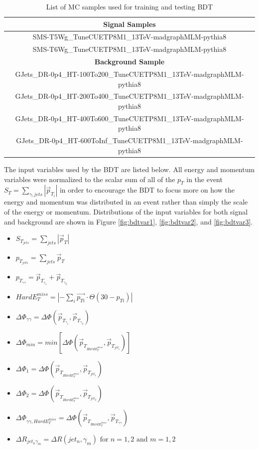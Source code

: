 \begin{table}[h]
	\centering
	\caption{List of MC samples used for training and testing BDT}
	\begin{tabular}{|c|}
		\hline
		\textbf{Signal Samples} \\  
		\hline
		SMS-T5Wg\_TuneCUETP8M1\_13TeV-madgraphMLM-pythia8\\
		\hline
		SMS-T6Wg\_TuneCUETP8M1\_13TeV-madgraphMLM-pythia8\\
		\hline
		\textbf{Background Sample} \\ 
		\hline
		GJets\_DR-0p4\_HT-100To200\_TuneCUETP8M1\_13TeV-madgraphMLM-pythia8 \\
		\hline
		GJets\_DR-0p4\_HT-200To400\_TuneCUETP8M1\_13TeV-madgraphMLM-pythia8 \\
		\hline
		GJets\_DR-0p4\_HT-400To600\_TuneCUETP8M1\_13TeV-madgraphMLM-pythia8 \\
		\hline
		GJets\_DR-0p4\_HT-600ToInf\_TuneCUETP8M1\_13TeV-madgraphMLM-pythia8 \\
		\hline
	\end{tabular}
	\label{table:TrainingSamples}
\end{table}

 The input variables used by the BDT are listed below.  All energy and momentum variables were normalized to the scalar sum of all of the $p_T$ in the event $S_T = \sum_{\gamma,jets} |\vec{p}_{T_i}|$ in order to encourage the BDT to focus more on how the energy and momentum was distributed in an event rather than simply the scale of the energy or momentum.  Distributions of the input variables for both signal and background are shown in Figure \ref{fig:bdtvar1}, \ref{fig:bdtvar2}, and \ref{fig:bdtvar3}.

\begin{itemize}
	\item $S_{T_{jets}} = \sum_{jets}|\vec{p}_T|$
	\item $p_{T_{jets}} = \sum_{jets}\vec{p}_T$
	\item $p_{T_{\gamma \gamma}} = \vec{p}_{T_{\gamma_1}} + \vec{p}_{T_{\gamma_2}}$
	\item $Hard E_T^{miss} = |-\sum_{i}\vec{p_{Ti}}\cdot \Theta(30 -p_{Ti})|$
	\item $\Delta \Phi_{\gamma \gamma} = \Delta \Phi (\vec{p}_{T_{\gamma_1}}, \vec{p}_{T_{\gamma_2}})$
	\item $\Delta \Phi_{min} = min[\Delta \Phi (\vec{p}_{T_{HardE_T^{miss}}}, \vec{p}_{T_{jet_i}})]$
	\item $\Delta \Phi_{1} = \Delta \Phi (\vec{p}_{T_{HardE_T^{miss}}}, \vec{p}_{T_{jet_1}})$
	\item $\Delta \Phi_{2} = \Delta \Phi (\vec{p}_{T_{HardE_T^{miss}}}, \vec{p}_{T_{jet_2}})$
	\item $\Delta \Phi_{\gamma \gamma, HardE_T^{miss}} = \Delta \Phi (\vec{p}_{T_{HardE_T^{miss}}}, \vec{p}_{T_{\gamma \gamma}})$
	\item $\Delta R_{jet_n\gamma_m} = \Delta R(jet_n, \gamma_m) \text{ for } n=1,2 \text{ and } m=1,2$
\end{itemize}

